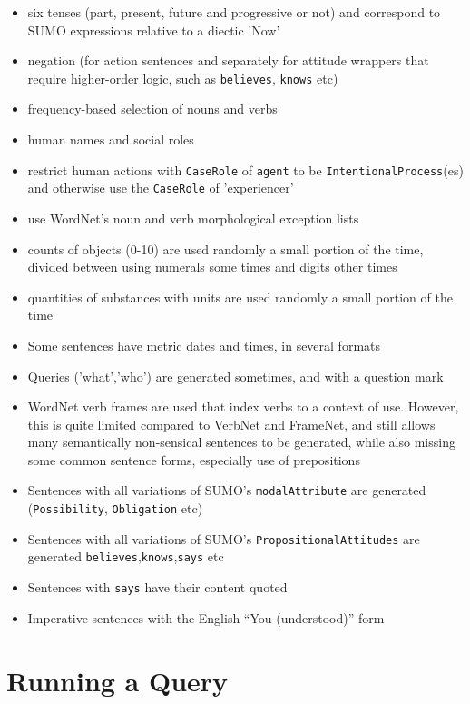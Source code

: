 \documentclass[runningheads]{llncs}
\begin{document}
\begin{itemize}
\item six tenses (part, present, future and progressive or not) and correspond to SUMO expressions relative to a diectic 'Now'
\item  negation (for action sentences and separately for attitude wrappers that require higher-order logic, such as \texttt{believes}, \texttt{knows} etc)
\item  frequency-based selection of nouns and verbs
\item  human names and social roles
\item  restrict human actions with \texttt{CaseRole} of \texttt{agent} to be \texttt{IntentionalProcess}(es) and otherwise use the \texttt{CaseRole} of 'experiencer'
\item  use WordNet's noun and verb morphological exception lists
\item  counts of objects (0-10) are used randomly a small portion of the time, divided between using numerals some times and digits other times
\item  quantities of substances with units are used randomly a small portion of the time
\item  Some sentences have metric dates and times, in several formats
\item  Queries ('what','who') are generated sometimes, and with a question mark
\item  WordNet verb frames are used that index verbs to a context of use. However, this is quite limited compared to VerbNet and FrameNet, and still allows many semantically non-sensical sentences to be generated, while also missing some common sentence forms, especially use of prepositions
\item  Sentences with all variations of SUMO's \texttt{modalAttribute} are generated (\texttt{Possibility}, \texttt{Obligation} etc)
\item  Sentences with all variations of SUMO's \texttt{PropositionalAttitudes} are generated \texttt{believes},\texttt{knows},\texttt{says} etc
\item  Sentences with \texttt{says} have their content quoted
\item Imperative sentences with the English ``You (understood)'' form
\end{itemize}

\section{Running a Query}
\label{Running}
\end{document}
